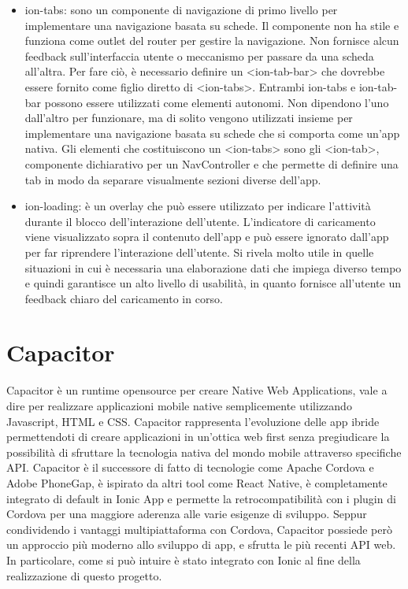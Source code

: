 \begin{itemize}
\item ion-tabs: sono un componente di navigazione di primo livello per implementare una navigazione basata su schede. Il componente non ha stile e funziona come outlet del router per gestire la navigazione. Non fornisce alcun feedback sull'interfaccia utente o meccanismo per passare da una scheda all'altra. Per fare ciò, è necessario definire un <ion-tab-bar> che dovrebbe essere fornito come figlio diretto di <ion-tabs>. 
Entrambi ion-tabs e ion-tab-bar possono essere utilizzati come elementi autonomi. Non dipendono l'uno dall'altro per funzionare, ma di solito vengono utilizzati insieme per implementare una navigazione basata su schede che si comporta come un'app nativa.
Gli elementi che costituiscono un <ion-tabs> sono gli <ion-tab>, componente dichiarativo per un NavController e che permette di definire una tab in modo da separare visualmente sezioni diverse dell'app. 
\item ion-loading: è un overlay che può essere utilizzato per indicare l'attività durante il blocco dell'interazione dell'utente. L'indicatore di caricamento viene visualizzato sopra il contenuto dell'app e può essere ignorato dall'app per far riprendere l'interazione dell'utente. Si rivela molto utile in quelle situazioni in cui è necessaria una elaborazione dati che impiega diverso tempo e quindi garantisce un alto livello di usabilità, in quanto fornisce all'utente un feedback chiaro del caricamento in corso.
\end{itemize}


\section{Capacitor}

Capacitor è un runtime opensource per creare Native Web Applications, vale a dire per realizzare applicazioni mobile native semplicemente utilizzando Javascript, HTML e CSS.
 Capacitor rappresenta l’evoluzione delle app ibride permettendoti di creare applicazioni in un’ottica web first senza pregiudicare la possibilità di sfruttare la tecnologia nativa del mondo mobile attraverso specifiche API.
Capacitor è il successore di fatto di tecnologie come Apache Cordova e Adobe PhoneGap, è ispirato da altri tool come React Native, è completamente integrato di default in Ionic App e permette la retrocompatibilità con i plugin di Cordova per una maggiore aderenza alle varie esigenze di sviluppo.  Seppur condividendo i vantaggi multipiattaforma con Cordova, Capacitor possiede però un approccio più moderno allo sviluppo di app, e sfrutta le più recenti API web. In particolare, come si può intuire è stato integrato con Ionic al fine della realizzazione di questo progetto.

